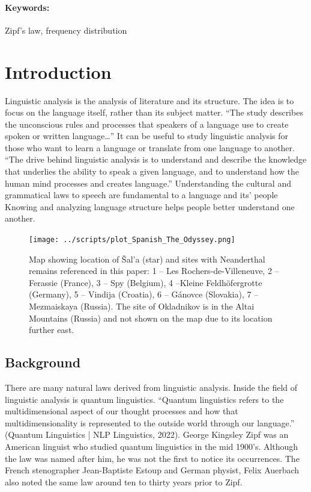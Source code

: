 \documentclass[a4paper,10pt]{article}
\begin{document}

\paragraph*{Keywords:} Zipf's law, frequency distribution

\section{Introduction}


Linguistic analysis is the analysis of literature and its
structure. The idea is to focus on the language itself, rather than
its subject matter. “The study describes the unconscious rules and
processes that speakers of a language use to create spoken or written
language…” It can be useful to study linguistic analysis for those who
want to learn a language or translate from one language to
another. “The drive behind linguistic analysis is to understand and
describe the knowledge that underlies the ability to speak a given
language, and to understand how the human mind processes and creates
language.” Understanding the cultural and grammatical laws to speech
are fundamental to a language and its’ people Knowing and analyzing
language structure helps people better understand one another.


\begin{figure}
	\centering
	\texttt{[image: ../scripts/plot\_Spanish\_The\_Odyssey.png]}
	\caption{Map showing location of Šal’a (star) and sites with Neanderthal remains referenced in this paper: 1 -- Les Rochers-de-Villeneuve, 2 -- Ferassie (France), 3 -- Spy (Belgium), 4 --Kleine Feldhöfergrotte (Germany), 5 -- Vindija (Croatia), 6 -- Gánovce (Slovakia), 7 -- Mezmaiskaya (Russia). The site of Okladnikov is in the Altai Mountains (Russia) and not shown on the map due to its location further east.}
	\label{fig:map}
\end{figure}


\subsection{Background}
There are many natural laws derived from linguistic analysis. Inside the field of linguistic analysis is quantum linguistics. “Quantum linguistics refers to the multidimensional aspect of our thought processes and how that multidimensionality is represented to the outside world through our language.” (Quantum Linguistics | NLP Linguistics, 2022). George Kingsley Zipf was an American linguist who studied quantum linguistics in the mid 1900’s. Although the law was named after him, he was not the first to notice its occurrences. The French stenographer Jean-Baptiste Estoup and German physist, Felix Auerbach also noted the same law around ten to thirty years prior to Zipf.  
\end{document}
